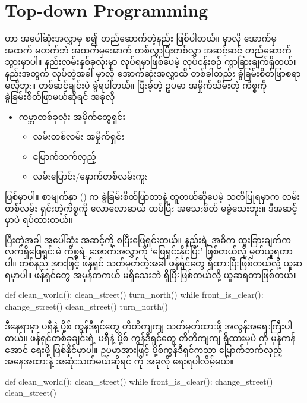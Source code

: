 \section{Top-down Programming}
 ဟာ အပေါ်ဆုံးအလွှာမှ စ၍ တည်ဆောက်တဲ့နည်း ဖြစ်ပါတယ်။  မှာလို အောက်မှ အထက် မတက်ဘဲ အထက်မှအောက် တစ်လွှာပြီးတစ်လွှာ အဆင့်ဆင့် တည်ဆောက်သွားမှာပါ။  နည်းလမ်းနှစ်ခုလုံးမှာ  လုပ်ရမှာဖြစ်ပေမဲ့ လုပ်ငန်းစဉ် ကွာခြားချက်ရှိတယ်။  နည်းအတွက်  လုပ်တဲ့အခါ   မှာလို အောက်ဆုံးအလွှာထိ တစ်ခါတည်း  ခွဲခြမ်းစိတ်ဖြာစရာမလိုဘူး။ တစ်ဆင့်ချင်းပဲ ခွဲရပါတယ်။ ပြီးခဲ့တဲ့ ဥပမာ အမှိုက်သိမ်းတဲ့ ကိစ္စကို ခွဲခြမ်းစိတ်ဖြာမယ်ဆိုရင် အခုလို

%
\begin{itemize}
    \item ကမ္ဘာတစ်ခုလုံး အမှိုက်တွေရှင်း 
    \begin{itemize}
        \item လမ်းတစ်လမ်း အမှိုက်ရှင်း       
        \item မြောက်ဘက်လှည့် 
        \item လမ်းပြောင်း/နောက်တစ်လမ်းကူး 
    \end{itemize}
\end{itemize}
%
ဖြစ်မှာပါ။ စာမျက်နှာ (\fRefNo{\pageref{fig:btmup_pd}}) က ခွဲခြမ်းစိတ်ဖြာတာနဲ့ တူတယ်ဆိုပေမဲ့ သတိပြုရမှာက လမ်းတစ်လမ်း ရှင်းတဲ့ကိစ္စကို လောလောဆယ် ထပ်ပြီး အသေးစိတ် မခွဲသေးဘူး။ ဒီအဆင့်မှာပဲ ရပ်ထားတယ်။ 

ပြီးတဲ့အခါ အပေါ်ဆုံး အဆင့်ကို စပြီးဖြေရှင်းတယ်။  နည်းရဲ့ အဓိက ထူးခြားချက်က လက်ရှိဖြေရှင်းမဲ့ ကိစ္စရဲ့ အောက်အလွှာကို ‘ဖြေရှင်းနိုင်ပြီး’ ဖြစ်တယ်လို့ မှတ်ယူရတာပါ။ တစ်နည်းအားဖြင့်  ဖန်ရှင် သတ်မှတ်တဲ့အခါ \fEn{,} \fEn{,}  ဖန်ရှင်တွေ ရှိထားပြီးဖြစ်တယ်လို့ ယူဆရမှာပါ။  ဖန်ရှင်တွေ အမှန်တကယ် မရှိသေးဘဲ ရှိပြီးဖြစ်တယ်လို့ ယူဆရတာဖြစ်တယ်။
%
\begin{py}
def clean_world():
    clean_street()
    turn_north()
    while front_is_clear():
        change_street()
        clean_street()
        turn_north()
\end{py}
%
ဒီနေရာမှာ ပရီနဲ့ ပို့စ် ကွန်ဒီရှင်တွေ တိတိကျကျ သတ်မှတ်ထားဖို့ အလွန်အရေးကြီးပါတယ်။ \fEn{,} \fEn{,}  ဖန်ရှင်တစ်ခုချင်းရဲ့ ပရီနဲ့ ပို့စ် ကွန်ဒီရှင်တွေ တိတိကျကျ ရှိထားမှပဲ  ကို မှန်ကန်အောင် ရေးဖို့ ဖြစ်နိုင်မှာပါ။ ဥပမာအားဖြင့်  ပို့စ်ကွန်ဒီရှင်ကသာ မြောက်ဘက်လှည့် အနေအထားနဲ့ အဆုံးသတ်မယ်ဆိုရင်  ကို အခုလို ရေးရပါလိမ့်မယ်။
%
\begin{py}
def clean_world():
    clean_street()
    while front_is_clear():
        change_street()
        clean_street()
\end{py}
%

